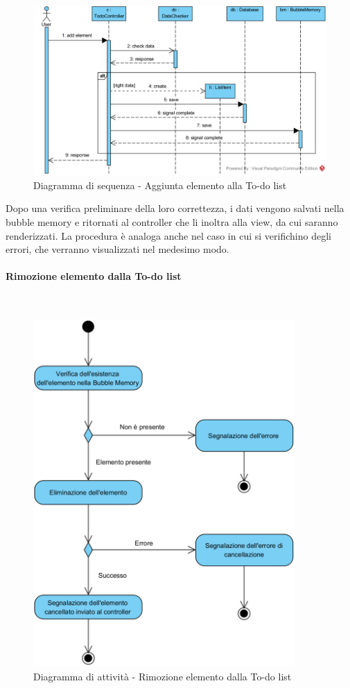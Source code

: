 \begin{figure}[H]
	\centering
	\includegraphics[width=14cm]{diagrammi_img/sequenza/todo_aggiungi_elemento.png}
	\caption{Diagramma di sequenza - Aggiunta elemento alla To-do list}
\end{figure}
Dopo una verifica preliminare della loro correttezza, i dati vengono salvati nella bubble memory e ritornati al controller che li inoltra alla view, da cui saranno renderizzati.
La procedura è analoga anche nel caso in cui si verifichino degli errori, che verranno visualizzati nel medesimo modo.


\paragraph{Rimozione elemento dalla To-do list}\mbox{}\\
\nopagebreak
\begin{figure}[H]
	\centering
	\includegraphics[width=10cm]{../../documenti/SpecificaTecnica/diagrammi_img/attivita/removeelementtodolist.png}
	\caption{Diagramma di attività - Rimozione elemento dalla To-do list}
\end{figure}

